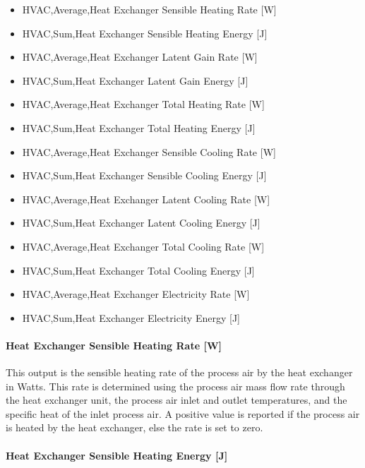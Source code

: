 \begin{itemize}
\item
  HVAC,Average,Heat Exchanger Sensible Heating Rate {[}W{]}
\item
  HVAC,Sum,Heat Exchanger Sensible Heating Energy {[}J{]}
\item
  HVAC,Average,Heat Exchanger Latent Gain Rate {[}W{]}
\item
  HVAC,Sum,Heat Exchanger Latent Gain Energy {[}J{]}
\item
  HVAC,Average,Heat Exchanger Total Heating Rate {[}W{]}
\item
  HVAC,Sum,Heat Exchanger Total Heating Energy {[}J{]}
\item
  HVAC,Average,Heat Exchanger Sensible Cooling Rate {[}W{]}
\item
  HVAC,Sum,Heat Exchanger Sensible Cooling Energy {[}J{]}
\item
  HVAC,Average,Heat Exchanger Latent Cooling Rate {[}W{]}
\item
  HVAC,Sum,Heat Exchanger Latent Cooling Energy {[}J{]}
\item
  HVAC,Average,Heat Exchanger Total Cooling Rate {[}W{]}
\item
  HVAC,Sum,Heat Exchanger Total Cooling Energy {[}J{]}
\item
  HVAC,Average,Heat Exchanger Electricity Rate {[}W{]}
\item
  HVAC,Sum,Heat Exchanger Electricity Energy {[}J{]}
\end{itemize}

\paragraph{Heat Exchanger Sensible Heating Rate {[}W{]}}\label{heat-exchanger-sensible-heating-rate-w-2}

This output is the sensible heating rate of the process air by the heat exchanger in Watts. This rate is determined using the process air mass flow rate through the heat exchanger unit, the process air inlet and outlet temperatures, and the specific heat of the inlet process air. A positive value is reported if the process air is heated by the heat exchanger, else the rate is set to zero.

\paragraph{Heat Exchanger Sensible Heating Energy {[}J{]}}\label{heat-exchanger-sensible-heating-energy-j-2}


